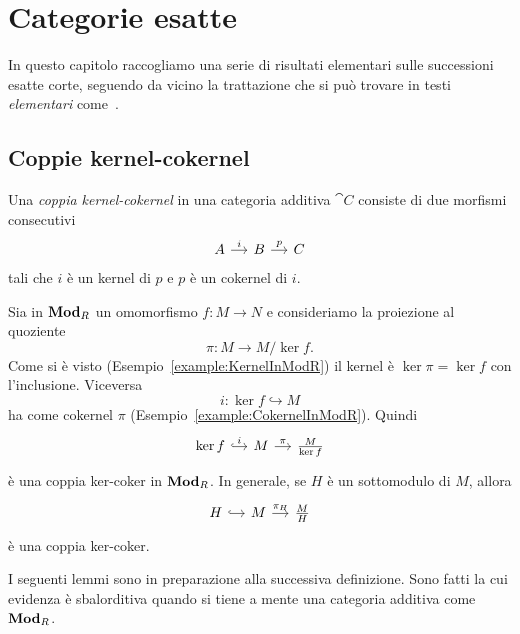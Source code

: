 
\chapter{Categorie esatte}

In questo capitolo raccogliamo una serie di risultati elementari sulle
successioni esatte corte, seguendo da vicino la trattazione che si può
trovare in testi {\em elementari} come~\cite{buehler:exactcategories}.



\section{Coppie kernel-cokernel}

\begin{definition}\label{definition:KerCoker}
  Una {\em coppia kernel-cokernel} in una categoria additiva \(\cat C\)
  consiste di due morfismi consecutivi
  \[
    \begin{tikzcd}[column sep=small]
      A \ar["i", r] & B \ar["p", r] & C
    \end{tikzcd}
  \]
  tali che \(i\) è un kernel di \(p\) e \(p\) è un cokernel di \(i\).
\end{definition}

\begin{example}
  Sia in \(\mathbf{Mod}_R\) un omomorfismo \(f : M \to N\) e consideriamo la
  proiezione al quoziente
  \[
    \pi : M \to M/\ker f .
  \]
  Come si è visto (Esempio~\ref{example:KernelInModR}) il kernel è
  \(\ker \pi = \ker f\) con l'inclusione. Viceversa
  \[
    i : \ker f \hookrightarrow M
  \]
  ha come cokernel \(\pi\) (Esempio~\ref{example:CokernelInModR}). Quindi
  \[
    \begin{tikzcd}[column sep=small]
      \ker f \ar["i", hookrightarrow, r] & M \ar["\pi", r] & \frac{M}{\ker
        f}
    \end{tikzcd}
  \]
  è una coppia ker-coker in \(\mathbf{Mod}_R\). In generale, se \(H\) è un
  sottomodulo di \(M\), allora
  \[
    \begin{tikzcd}[column sep=small]
      H \ar[hookrightarrow, r] & M \ar["{\pi_H}", r] & \frac{M}{H}
    \end{tikzcd}
  \]
  è una coppia ker-coker.
\end{example}

I seguenti lemmi sono in preparazione alla successiva definizione. Sono
fatti la cui evidenza è sbalorditiva quando si tiene a mente una
categoria additiva come \(\mathbf{Mod}_R\).

